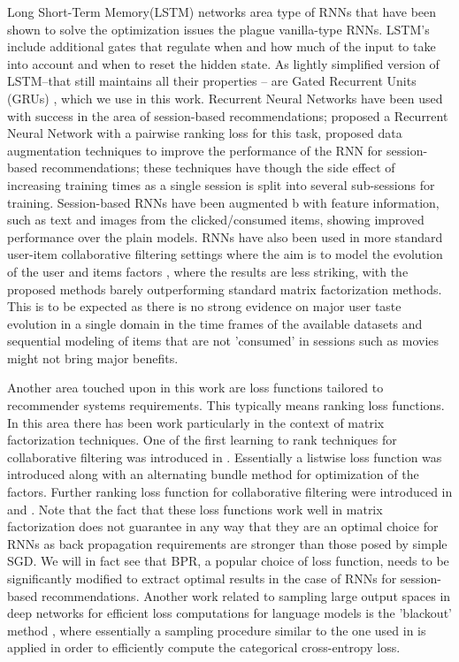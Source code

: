 \documentclass{article} %
\begin{document}
Long Short-Term Memory(LSTM) \cite{hochreiter1997long} networks area type of RNNs that have been shown to solve the optimization issues the plague vanilla-type RNNs. LSTM’s include additional gates that regulate when and how much of the input to take into account and when to reset the hidden state. As lightly simpliﬁed version of LSTM–that still maintains all their properties – are Gated Recurrent Units (GRUs) \cite{cho2014bv}, which we use in this work. Recurrent Neural Networks have been used with success in the area of session-based recommendations; \cite{hidasi2016a} proposed a Recurrent Neural Network with a pairwise ranking loss for this task, \cite{tan2016improved} proposed data augmentation techniques to improve the performance of the RNN for session-based recommendations; these techniques have though the side effect of increasing training times as a single session is split into several sub-sessions for training. Session-based RNNs have been augmented \cite{hidasi2016parallel} b with feature information, such as text and images from the clicked/consumed items, showing improved performance over the plain models. RNNs have also been used in more standard user-item collaborative ﬁltering settings where the aim is to model the evolution of the user and items factors \cite{wu2017recurrent},\cite{devooght2016collaborative} where the results are less striking, with the proposed methods barely outperforming standard matrix factorization methods. This is to be expected as there is no strong evidence on major user taste evolution in a single domain in the time frames of the available datasets and sequential modeling of items that are not ’consumed’ in sessions such as movies might not bring major beneﬁts. 

Another area touched upon in this work are loss functions tailored to recommender systems requirements. This typically means ranking loss functions. In this area there has been work particularly in
the context of matrix factorization techniques. One of the first learning to rank techniques for collaborative filtering was introduced in \cite{weimer2007cofirank}. Essentially a listwise loss function was
introduced along with an alternating bundle method for optimization of the factors. Further ranking
loss function for collaborative filtering were introduced in \cite{shi2012climf} \cite{rendle2012bpr}
and \cite{rendle2012bpr}. Note that the fact that these loss functions work well in matrix factorization does not guarantee in any way that they are an optimal choice for RNNs as back propagation
requirements are stronger than those posed by simple SGD. We will in fact see that BPR, a popular
choice of loss function, needs to be significantly modified to extract optimal results in the case of
RNNs for session-based recommendations. Another work related to sampling large output spaces
in deep networks for efficient loss computations for language models is the ’blackout’ method \cite{ji2015blackout}, where essentially a sampling procedure similar to the one used in \cite{hidasi2015session}
is applied in order to efficiently compute the categorical cross-entropy loss.
\end{document}
